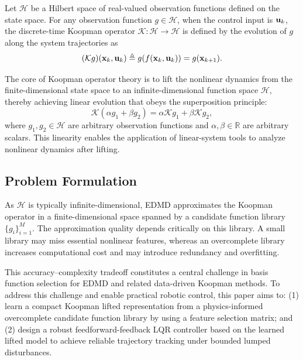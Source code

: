 Let \(\mathcal{H}\) be a Hilbert space of real-valued observation functions defined on the state space. For any observation function \(g \in \mathcal{H}\), when the control input is \(\mathbf{u}_k\), the discrete-time Koopman operator \(\mathcal{K}: \mathcal{H} \to \mathcal{H}\) is defined by the evolution of \(g\) along the system trajectories as
\begin{equation}
(\mathcal{K}g)(\mathbf{x}_k,\mathbf{u}_k) \triangleq g(f(\mathbf{x}_k,\mathbf{u}_k)) = g(\mathbf{x}_{k+1}).
\end{equation}

The core of Koopman operator theory is to lift the nonlinear dynamics
from the finite-dimensional state space to an infinite-dimensional
function space $\mathcal{H}$, thereby achieving linear evolution that
obeys the superposition principle:
\begin{equation}
\mathcal{K}(\alpha g_1 + \beta g_2) = \alpha \mathcal{K}g_1 + \beta \mathcal{K}g_2,
\end{equation}
where $g_1, g_2 \in \mathcal{H}$ are arbitrary observation functions and $\alpha, \beta \in \mathbb{R}$ are arbitrary
scalars. This linearity enables the application of linear-system tools to analyze
nonlinear dynamics after lifting.

\subsection{Problem Formulation}
\label{subsec:motivation}
As $\mathcal{H}$ is typically infinite-dimensional, EDMD approximates the Koopman operator in a finite-dimensional space spanned by a candidate function library $\{g_i\}_{i=1}^M$. The approximation quality depends critically on this library. A small library may miss essential nonlinear features, whereas an overcomplete library increases computational cost and may introduce redundancy and overfitting.

This accuracy--complexity tradeoff constitutes a central challenge in basis function selection for EDMD and related data-driven Koopman methods. To address this challenge and enable practical robotic control, this paper aims to: (1) learn a compact Koopman lifted representation from a physics-informed overcomplete candidate function library by using a feature selection matrix; and (2) design a robust feedforward-feedback LQR controller based on the learned lifted model to achieve reliable trajectory tracking under bounded lumped disturbances.



